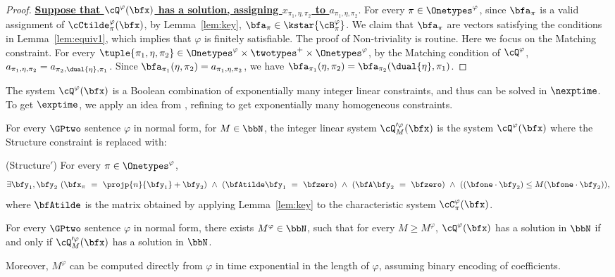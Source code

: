 \begin{proof}
    \textbf{\uline{Suppose that $\cQ^\varphi(\bfx)$ has a solution, assigning  $x_{\pi_1, \eta, \pi_2}$ to $a_{\pi_1, \eta, \pi_2}$}}.
    For every $\pi \in \Onetypes^\varphi$,
    since $\bfa_{\pi}$ is a valid assignment of $\cCtilde^\varphi_\pi(\bfx)$,
    by Lemma~\ref{lem:key},
    $\bfa_{\pi} \in \kstar{\cB^\varphi_{\pi}}$.
    We claim that $\bfa_{\pi}$ are vectors satisfying the conditions in Lemma~\ref{lem:equiv1},
    which implies that $\varphi$ is finitely satisfiable.
    The proof of Non-triviality is routine. 
    Here we focus on the Matching constraint.
    For every $\tuple{\pi_1, \eta, \pi_2} \in \Onetypes^\varphi \times \twotypes^+ \times \Onetypes^\varphi$,
    by the Matching condition of $\cQ^\varphi$,
    $a_{\pi_1, \eta, \pi_2} = a_{\pi_2, \dual{\eta}, \pi_1}$.
    Since $\bfa_{\pi_1}(\eta, \pi_2) = a_{\pi_1, \eta, \pi_2}$,
    we have $\bfa_{\pi_1}(\eta, \pi_2) = \bfa_{\pi_2}(\dual{\eta}, \pi_1)$.
\end{proof}

The system $\cQ^\varphi(\bfx)$ is a Boolean combination of exponentially many integer linear constraints, and thus can be solved in
$\nexptime$. To get $\exptime$, we apply an idea from \cite{gctwocomplexity}, refining to get exponentially many homogeneous constraints.
\begin{definition}
    For every $\GPtwo$ sentence $\varphi$ in normal form,
    for $M \in \bbN$,
    the integer linear system $\cQ_M'^\varphi(\bfx)$ is the system $\cQ^\varphi(\bfx)$
    where the Structure constraint is replaced with:
    \begin{compactitem}
        \item (Structure$'$)
            For every $\pi \in \Onetypes^\varphi$,
            \begin{equation*}
                \exists \bfy_1, \bfy_2\ 
                (\bfx_\pi\ =\ \projp{n}{\bfy_1} + \bfy_2)\ \land\ 
                (\bfAtilde\bfy_1\ =\ \bfzero)\ \land\ 
                (\bfA\bfy_2\ =\ \bfzero)\ \land\ 
                ((\bfone \cdot \bfy_2) \le M (\bfone \cdot \bfy_2)),
            \end{equation*}
            where $\bfAtilde$ is the matrix obtained by applying Lemma~\ref{lem:key}
            to the characteristic system $\cC^\varphi_\pi(\bfx)$.
    \end{compactitem}
\end{definition}

\begin{lemma}\label{lem:equiv3}
    For every $\GPtwo$ sentence $\varphi$ in normal form,
    there exists $M^\varphi \in \bbN$, such that
    for every $M \ge M^\varphi$,
    $\cQ^\varphi(\bfx)$ has a solution in $\bbN$ if and only if
    $\cQ_{M}'^\varphi(\bfx)$ has a solution in $\bbN$.

    Moreover, $M^\varphi$ can be computed directly from $\varphi$ in time exponential in the length of $\varphi$, assuming binary encoding of coefficients.
\end{lemma}

